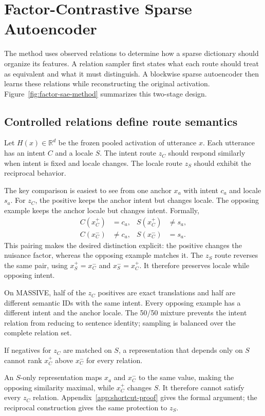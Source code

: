 \section{Factor-Contrastive Sparse Autoencoder}
\label{sec:method}

The method uses observed relations to determine how a sparse dictionary should organize its features. A relation sampler first states what each route should treat as equivalent and what it must distinguish. A blockwise sparse autoencoder then learns these relations while reconstructing the original activation. Figure~\ref{fig:factor-sae-method} summarizes this two-stage design.

\subsection{Controlled relations define route semantics}

Let $H(x)\in\mathbb{R}^{d}$ be the frozen pooled activation of utterance $x$. Each utterance has an intent $C$ and a locale $S$. The intent route $z_C$ should respond similarly when intent is fixed and locale changes. The locale route $z_S$ should exhibit the reciprocal behavior.

The key comparison is easiest to see from one anchor $x_a$ with intent $c_a$ and locale $s_a$. For $z_C$, the positive keeps the anchor intent but changes locale. The opposing example keeps the anchor locale but changes intent. Formally,
\begin{equation}
\begin{aligned}
C(x_C^+)&=c_a, & S(x_C^+)&\neq s_a,\\
C(x_C^-)&\neq c_a, & S(x_C^-)&=s_a.
\end{aligned}
\label{eq:c-relations}
\end{equation}
This pairing makes the desired distinction explicit: the positive changes the nuisance factor, whereas the opposing example matches it. The $z_S$ route reverses the same pair, using $x_S^+=x_C^-$ and $x_S^-=x_C^+$. It therefore preserves locale while opposing intent.

On MASSIVE, half of the $z_C$ positives are exact translations and half are different semantic IDs with the same intent. Every opposing example has a different intent and the anchor locale. The 50/50 mixture prevents the intent relation from reducing to sentence identity; sampling is balanced over the complete relation set.

\begin{proposition}
If negatives for $z_C$ are matched on $S$, a representation that depends only on $S$ cannot rank $x_C^+$ above $x_C^-$ for every relation.
\label{prop:matched-shortcut}
\end{proposition}
An $S$-only representation maps $x_a$ and $x_C^-$ to the same value, making the opposing similarity maximal, while $x_C^+$ changes $S$. It therefore cannot satisfy every $z_C$ relation. Appendix~\ref{app:shortcut-proof} gives the formal argument; the reciprocal construction gives the same protection to $z_S$.

